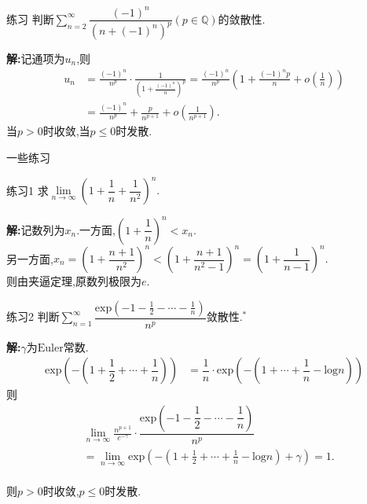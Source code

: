 \documentclass[UTF8]{ctexbeamer}
\begin{document}
    \begin{frame}
        \begin{exampleblock}{练习}
            判断$\sum\limits_{n=2}^{\infty}\dfrac{(-1)^n}{(n+(-1)^n)^p}(p\in\mathbb{Q})$的敛散性.
        \end{exampleblock}
        \pause
        \textbf{解:}记通项为$u_n$,则
        \pause
        $$
        \begin{aligned}
            u_n&=\frac{(-1)^n}{n^p}\cdot\frac{1}{\left(1+\frac{(-1)^n}{n}\right)^p}=\frac{(-1)^n}{n^p}\left(1+\frac{(-1)^np}{n}+o\left(\frac{1}{n}\right)\right)\\
            &=\frac{(-1)^n}{n^p}+\frac{p}{n^{p+1}}+o\left(\frac{1}{n^{p+1}}\right).
        \end{aligned}
        $$
        \pause
        当$p> 0$时收敛,当$p\leqslant 0$时发散.
    \end{frame}
    \begin{frame}{一些练习}
        \begin{exampleblock}{练习1}
            求$\lim\limits_{n\to\infty}\left(1+\dfrac{1}{n}+\dfrac{1}{n^2}\right)^n.$
        \end{exampleblock}
        \pause
        \textbf{解:}记数列为$x_n$.一方面,$\left(1+\dfrac{1}{n}\right)^n<x_n.$
        \pause
        \\另一方面,$x_n=\left(1+\dfrac{n+1}{n^2}\right)^n<\left(1+\dfrac{n+1}{n^2-1}\right)^n=\left(1+\dfrac{1}{n-1}\right)^n.$
        \pause
        \\则由夹逼定理,原数列极限为$e$.
    \end{frame}
    \begin{frame}
        \begin{exampleblock}{练习2}
            判断$\sum\limits_{n=1}^{\infty}\dfrac{\mathrm{exp}{\left(-1-\frac{1}{2}-\cdots-\frac{1}{n}\right)}}{n^p}$敛散性.$^\ast$
        \end{exampleblock}
        \pause
        \textbf{解:}$\gamma$为$\mathrm{Euler}$常数.
        $$
        \begin{aligned}
            \mathrm{exp}\left(-\left(1+\dfrac{1}{2}+\cdots+\dfrac{1}{n}\right)\right)&=\dfrac{1}{n}\cdot\mathrm{exp}\left(-\left(1+\cdots+\dfrac{1}{n}-\mathrm{log}n\right)\right)
        \end{aligned}
        $$
        \pause
        则
        $$
        \begin{aligned}
            &\lim_{n\to\infty}\frac{n^{p+1}}{e^{-\gamma}}\cdot\dfrac{\mathrm{exp}{\left(-1-\dfrac{1}{2}-\cdots-\dfrac{1}{n}\right)}}{n^p}\\
            &=\lim_{n\to\infty}\mathrm{exp}\left(-\left(1+\frac{1}{2}+\cdots+\frac{1}{n}-\mathrm{log}n\right)+\gamma\right)=1. 
        \end{aligned}
        $$
        \pause
        \\则$p>0$时收敛,$p\leqslant 0$时发散.
    \end{frame}
\end{document}
